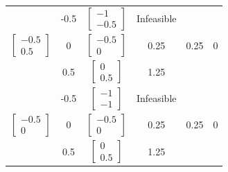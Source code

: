 \begin{latin}
\begin{longtable}{|c|c|c|c|c|c|}
		&          -0.5              &$\begin{bmatrix} -1 \\ -0.5 \end{bmatrix}$      & Infeasible                        &       &          \\  \cline{2-4} 
		\multirow{-3}{*}{$\begin{bmatrix} -0.5 \\ 0.5 \end{bmatrix}$}&     0                   &$\begin{bmatrix} -0.5 \\ 0 \end{bmatrix}$      &     0.25                   &  0.25           &   0    \\  \cline{2-4} 
		&         0.5               &$\begin{bmatrix} 0 \\ 0.5 \end{bmatrix}$      &        1.25                    &          &      \\  \cline{2-4} \hline
		
		&              -0.5          &$\begin{bmatrix} -1 \\ -1 \end{bmatrix}$      & Infeasible                        &      &     \\  \cline{2-4} 
		\multirow{-3}{*}{$\begin{bmatrix} -0.5 \\ 0 \end{bmatrix}$}&      0                  &$\begin{bmatrix} -0.5 \\ 0 \end{bmatrix}$      &      0.25                  &  0.25          &     0   \\  \cline{2-4} 
		&              0.5          &$\begin{bmatrix} 0 \\ 0.5 \end{bmatrix}$      &    1.25                &                 &     \\  \cline{2-4} \hline	
		

\end{longtable}
\end{latin}
